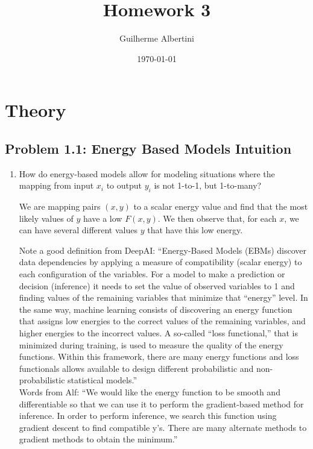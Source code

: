 \documentclass{article}
\title{Homework 3}
\author{Guilherme Albertini}
\date\today
\begin{document}
\maketitle %

\section*{Theory}
\subsection*{Problem 1.1: Energy Based Models Intuition}
\begin{enumerate}
	\item How do energy-based models allow for modeling situations where
	      the
	      mapping from input $x_i$ to output $y_i$ is not 1-to-1, but
	      1-to-many?
	      \begin{tcolorbox}
		      We are mapping pairs $(x,y)$ to a scalar energy value
		      and find that the most likely values of $y$ have a low
		      $F(x,y)$. We then
		      observe that, for each $x$, we can have several different
		      values $y$ that have
		      this low energy.
	      \end{tcolorbox}
	      \begin{tcolorbox}

		      Note a good definition from DeepAI: ``Energy-Based
		      Models (EBMs) discover data dependencies by applying a
		      measure of
		      compatibility (scalar energy) to each configuration of
		      the variables. For a model to make a prediction or
		      decision (inference)
		      it needs to set the value of observed variables to 1
		      and finding values of the remaining variables that
		      minimize that “energy”
		      level.
		      In the same way, machine learning consists of
		      discovering an energy function that assigns low energies
		      to the correct values
		      of the remaining variables,
		      and higher energies to the incorrect values. A
		      so-called “loss functional,” that is minimized during
		      training, is used to
		      measure the quality of the energy functions. Within this
		      framework, there are
		      many energy functions and loss functionals allows
		      available to design different
		      probabilistic and non-probabilistic statistical
		      models.''\\
		      Words from Alf: ``We would like the energy function to
		      be smooth and differentiable so that we can use it to
		      perform the
		      gradient-based method for inference. In order to perform
		      inference, we search
		      this function using gradient descent to find compatible
		      y's. There are many
		      alternate methods to gradient methods to obtain the
		      minimum.''
	      \end{tcolorbox}


\end{enumerate}
\end{document}
